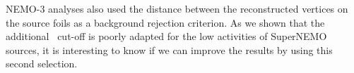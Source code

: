 
NEMO-$3$ analyses also used the distance between the reconstructed vertices on the source foils as a background rejection criterion.
As we shown that the additional \Pint\ cut-off is poorly adapted for the low activities of SuperNEMO sources, it is interesting to know if we can improve the results by using this second selection.


